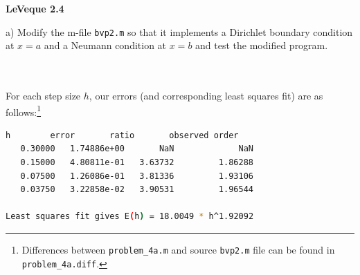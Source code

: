 \textbf{LeVeque 2.4} 

a) Modify the m-file \texttt{bvp2.m} so that it implements a Dirichlet boundary condition at $x = a$ and a Neumann
   condition at $x = b$ and test the modified program.

\begin{solution}\ \\\\
   For each step size $h$, our errors (and corresponding least squares fit) are as follows:\footnote{
      Differences between \texttt{problem\_4a.m} and source \texttt{bvp2.m} file can be found in
      \texttt{problem\_4a.diff}. 
   }\\
     
   \begin{lstlisting}[language=bash, basicstyle=\tiny]
      h        error       ratio       observed order
   0.30000   1.74886e+00       NaN             NaN
   0.15000   4.80811e-01   3.63732         1.86288
   0.07500   1.26086e-01   3.81336         1.93106
   0.03750   3.22858e-02   3.90531         1.96544

Least squares fit gives E(h) = 18.0049 * h^1.92092
   \end{lstlisting}


\end{solution}
